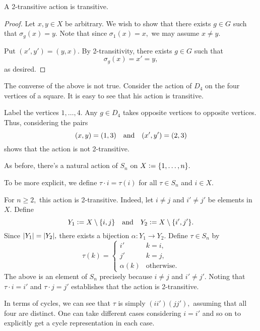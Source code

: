 \begin{prop} \label{prop:2transistrans}
	A 2-transitive action is transitive.
\end{prop}
\begin{proof} 
	Let $x, y \in X$ be arbitrary. We wish to show that there exists $g \in G$ such that $\sigma_g(x) = y.$ Note that since $\sigma_1(x) = x,$ we may assume $x \neq y.$

	Put $(x', y') = (y, x).$ By 2-transitivity, there exists $g \in G$ such that 
	\begin{equation*} 
		\sigma_g(x) = x' = y,
	\end{equation*}
	as desired.
\end{proof}

\begin{ex}[Action of $D_4$]
	The converse of the above is not true. Consider the action of $D_4$ on the four vertices of a square. It is easy to see that his action is transitive. 

	Label the vertices $1, \ldots, 4.$ Any $g \in D_4$ takes opposite vertices to opposite vertices. Thus, considering the pairs
	\begin{equation*} 
		(x, y) = (1, 3) \quad\text{and}\quad (x', y') = (2, 3)
	\end{equation*}
	shows that the action is not 2-transitive.
\end{ex}

\begin{ex} \label{ex:actsymgroups}
	As before, there's a natural action of $S_n$ on $X \vcentcolon= \{1, \ldots, n\}.$ 

	To be more explicit, we define $\tau \cdot i = \tau(i)$ for all $\tau \in S_n$ and $i \in X.$

	For $n \ge 2,$ this action is 2-transitive. Indeed, let $i \neq j$ and $i' \neq j'$ be elements in $X.$ Define 
	\begin{equation*} 
		Y_1 \vcentcolon= X \setminus \{i, j\} \quad\text{and}\quad Y_2 \vcentcolon= X \setminus \{i', j'\}.
	\end{equation*}
	Since ${\left\lvert Y_1 \right\lvert} = {\left\lvert Y_2 \right\lvert},$ there exists a bijection $\alpha : Y_1 \to Y_2.$ Define $\tau \in S_n$ by
	\begin{equation*} 
		\tau(k) = \begin{cases}
			i' & k = i,\\
			j' & k = j,\\
			\alpha(k) & \text{otherwise}.
		\end{cases}
	\end{equation*}
	The above is an element of $S_n$ precisely because $i \neq j$ and $i' \neq j'.$ Noting that $\tau \cdot i = i'$ and $\tau \cdot j = j'$ establishes that the action is 2-transitive.

	In terms of cycles, we can see that $\tau$ is simply $(ii')(jj'),$ assuming that all four are distinct. One can take different cases considering $i = i'$ and so on to explicitly get a cycle representation in each case.
\end{ex}

